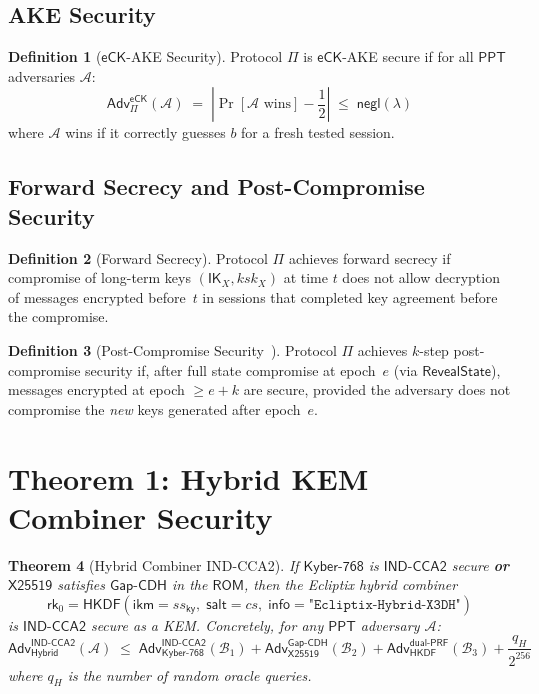 \documentclass[11pt,a4paper]{article}
\newtheorem{theorem}{Theorem}[section]
\theoremstyle{definition}
\newtheorem{definition}[theorem]{Definition}
\theoremstyle{remark}
\newcommand{\secpar}{\lambda}
\newcommand{\negl}{\mathsf{negl}}
\newcommand{\ppt}{\mathsf{PPT}}
\newcommand{\adv}{\mathsf{Adv}}
\newcommand{\advA}{\mathcal{A}}
\newcommand{\advB}{\mathcal{B}}
\newcommand{\HKDF}{\mathsf{HKDF}}
\renewcommand{\DH}{\mathsf{X25519}}
\newcommand{\KEM}{\mathsf{Kyber\text{-}768}}
\newcommand{\GapCDH}{\mathsf{Gap\text{-}CDH}}
\newcommand{\INDCCA}{\mathsf{IND\text{-}CCA2}}
\newcommand{\dualPRF}{\mathsf{dual\text{-}PRF}}
\newcommand{\ROM}{\mathsf{ROM}}
\newcommand{\eCK}{\mathsf{eCK}}
\newcommand{\IK}{\mathsf{IK}}
\newcommand{\rk}{\mathsf{rk}}
\begin{document}
\subsection{AKE Security}

\begin{definition}[$\eCK$-AKE Security]
\label{def:ake}
Protocol $\Pi$ is $\eCK$-AKE secure if for all $\ppt$ adversaries $\advA$:
\[
  \adv^{\eCK}_\Pi(\advA) \;=\;
  \left|\Pr[\advA \text{ wins}] - \frac{1}{2}\right|
  \;\leq\; \negl(\secpar)
\]
where $\advA$ wins if it correctly guesses $b$ for a fresh tested session.
\end{definition}

\subsection{Forward Secrecy and Post-Compromise Security}

\begin{definition}[Forward Secrecy]
\label{def:fs}
Protocol $\Pi$ achieves forward secrecy if compromise of long-term keys
$(\IK_X, \mathit{ksk}_X)$ at time $t$ does not allow decryption of messages
encrypted before~$t$ in sessions that completed key agreement before the
compromise.
\end{definition}

\begin{definition}[Post-Compromise Security~\cite{cohn-gordon2020}]
\label{def:pcs}
Protocol $\Pi$ achieves $k$-step post-compromise security if, after full state
compromise at epoch~$e$ (via $\mathsf{RevealState}$), messages encrypted at
epoch $\geq e + k$ are secure, provided the adversary does not compromise the
\emph{new} keys generated after epoch~$e$.
\end{definition}


\section{Theorem 1: Hybrid KEM Combiner Security}
\label{sec:thm1}

\begin{theorem}[Hybrid Combiner IND-CCA2]
\label{thm:combiner}
If $\KEM$ is $\INDCCA$ secure \textbf{or} $\DH$ satisfies $\GapCDH$ in the
$\ROM$, then the Ecliptix hybrid combiner
\[
  \rk_0 = \HKDF(\mathsf{ikm} = \mathit{ss}_{\mathsf{ky}},\;
    \mathsf{salt} = \mathit{cs},\;
    \mathsf{info} = \texttt{"Ecliptix-Hybrid-X3DH"})
\]
is $\INDCCA$ secure as a KEM.  Concretely, for any $\ppt$ adversary $\advA$:
\[
  \adv^{\INDCCA}_{\mathsf{Hybrid}}(\advA) \;\leq\;
  \adv^{\INDCCA}_{\KEM}(\advB_1) +
  \adv^{\GapCDH}_{\DH}(\advB_2) +
  \adv^{\dualPRF}_{\HKDF}(\advB_3) +
  \frac{q_H}{2^{256}}
\]
where $q_H$ is the number of random oracle queries.
\end{theorem}
\end{document}
